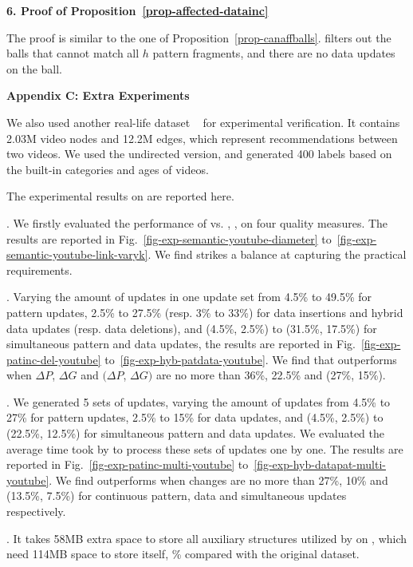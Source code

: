 \noindent
{\textbf{6. Proof of Proposition~\ref{prop-affected-datainc}}}
	
The proof is similar to the one of Proposition~\ref{prop-canaffballs}.
\identifyaffball filters out the balls that cannot match all $h$ pattern fragments,	and there are no data updates on the ball.

\vspace{1ex}
\noindent
{\large \textbf{Appendix C: Extra Experiments}}
\label{sec-apd-exp}

\vspace{-0.5ex}

We also used another real-life dataset {\em \youtube}~\cite{youtubeWeb} for experimental verification.
It contains 2.03M video nodes and 12.2M edges, which represent recommendations between two videos. We used the undirected version, and generated 400 labels based on the built-in categories and ages of videos.

\vspace{-1.5ex}
The experimental results on \youtube are reported here.

\vspace{-1.8ex}
. We firstly evaluated the performance of \optgrouprec vs. \mindia, \minsumdis, \denalk on \youtube \wrt four quality measures.
The results are reported in Fig.~\ref{fig-exp-semantic-youtube-diameter} to~\ref{fig-exp-semantic-youtube-link-varyk}.
We find \optgrouprec strikes a balance at capturing the practical requirements.

\vspace{-1.8ex}
. Varying the amount of updates in one update set from 4.5\% to 49.5\% for pattern updates, 2.5\% to 27.5\% (resp. 3\% to 33\%) for data insertions and hybrid data updates (resp. data deletions), and (4.5\%, 2.5\%) to (31.5\%, 17.5\%) for simultaneous pattern and data updates, the results are reported in Fig.~\ref{fig-exp-patinc-del-youtube} to~\ref{fig-exp-hyb-patdata-youtube}.
We find that \inc outperforms \optgrouprec when $\Delta P$, $\Delta G$ and $(\Delta P$, $\Delta G)$ are no more than 36\%, 22.5\% and (27\%, 15\%).

\vspace{-1.8ex}
. We generated 5 sets of updates,
varying the amount of updates from 4.5\% to 27\% for pattern updates, 2.5\% to 15\% for data updates,
and (4.5\%, 2.5\%) to (22.5\%, 12.5\%) for simultaneous pattern and data updates.
We evaluated the average time took by \inc to process these sets of updates one by one.
The results are reported in Fig.~\ref{fig-exp-patinc-multi-youtube} to~\ref{fig-exp-hyb-datapat-multi-youtube}.
We find \inc outperforms \optgrouprec when changes are no more than 27\%, 10\% and (13.5\%, 7.5\%) for continuous pattern, data and simultaneous updates respectively.

\vspace{-1.8ex}
. It takes 58MB extra space to store all auxiliary structures utilized by \inc on \youtube, which need 114MB space to store itself,
\% compared with the original dataset.
